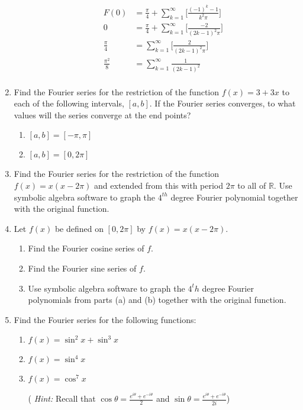 \documentclass{article}
\begin{document}
\begin{enumerate}
\begin{enumerate}
\begin{align*}
        F(0) &= \frac{\pi}{4} + \sum^{\infty}_{k=1}\Bigg[ \frac{(-1)^k-1}{k^2\pi} \Bigg] \\ 
        0 &= \frac{\pi}{4} + \sum^{\infty}_{k=1}\Bigg[ \frac{-2}{(2k - 1)^2\pi} \Bigg] \\
         \frac{\pi}{4} &= \sum^{\infty}_{k=1}\Bigg[ \frac{2}{(2k - 1)^2\pi} \Bigg] \\
         \frac{\pi^2}{8} &= \sum^{\infty}_{k=1} \frac{1}{(2k - 1)^2} \\
\end{align*}
\end{enumerate}
\item Find the Fourier series for the restriction of the function $f(x) = 3 + 3x$ to each of the following intervals, $[a,b]$. If the Fourier series converges, to what values will the series converge at the end points?
\begin{enumerate}
\item $[a,b] = [-\pi, \pi] $
\item $[a,b] = [0, 2\pi]$
\end{enumerate}

\item Find the Fourier series for the restriction of the function $f(x) = x(x-2\pi)$ and extended from this with period $2\pi$ to all of $\mathbb{R}$. Use symbolic algebra software to graph the $4^{th}$ degree Fourier polynomial together with the original function.

\item Let $f(x)$ be defined on $[0,2\pi]$ by $f(x) = x(x-2\pi)$.
\begin{enumerate}
\item Find the Fourier cosine series of $f$.
\item Find the Fourier sine series of $f$.
\item Use symbolic algebra software to graph the $4^th$ degree Fourier polynomials from parts (a) and (b) together with the original function.
\end{enumerate}
\item Find the Fourier series for the following functions:
\begin{enumerate}
\item $f(x) = \sin^2x + \sin^3x$
\item $f(x) = \sin^4x$
\item $f(x) = \cos^7x$

( \textit{Hint:} Recall that $\cos \theta = \frac{e^{i\theta} + e^{-i\theta}}{2}$ and $\sin \theta = \frac{e^{i\theta} + e^{-i\theta}}{2i}$)
\end{enumerate}


\end{enumerate}
\end{document}
